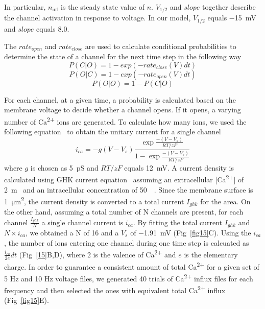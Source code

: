 \documentclass[10pt,letterpaper]{article}
\begin{document}
In particular, $n_{\inf}$ is the steady state value of $n$. $V_{1/2}$ and $slope$ together describe the channel activation in response to voltage. In our model, $V_{1/2}$ equals \SI{-15}{\mV} and $slope$ equals 8.0.

The $rate_{open}$ and $rate_{close}$ are used to calculate conditional probabilities to determine the state of a channel for the next time step in the following way
\begin{equation}P(C|O)=1-exp(-rate_{close}(V)dt)\end{equation}
\begin{equation}P(O|C)=1-exp(-rate_{open}(V)dt)\end{equation}
\begin{equation}P(O|O)=1-P(C|O)\end{equation}

For each channel, at a given time, a probability is calculated based on the membrane voltage to decide whether a channel opens. If it opens, a varying number of Ca\textsuperscript{2+} ions are generated. To calculate how many ions, we used the following equation~\cite{2013PNAS..11015794T} to obtain the unitary current for a single channel
\begin{equation}i_{ca}=-g(V-V_s)\frac{\exp\frac{-(V-V_s)}{RT/zF}}{1-\exp\frac{-(V-V_s)}{RT/zF}}\end{equation}
where $g$ is chosen as \SI{5}{\pico\siemens} and $RT/zF$ equals \SI{12}{\milli\volt}. A current density is calculated using GHK current equation~\cite{citeulike:306134} assuming an extracellular [Ca\textsuperscript{2+}] of \SI{2}{\m\Molar} and an intracellular concentration of \SI{50}{\nano\Molar}. Since the membrane surface is \SI{1}{\square\um}, the current density is converted to a total current $I_{ghk}$ for the area. On the other hand, assuming a total number of N channels are present, for each channel $\frac{I_{ghk}}{N}$ a single channel current is $i_{ca}$. By fitting the total current $I_{ghk}$ and $N\times i_{ca}$, we obtained a N of 16 and a $V_s$ of \SI{-1.91}{\milli\volt} (Fig~\ref{fig15}C). Using the $i_{ca}$, the number of ions entering one channel during one time step is calcuated as $\frac{i_{ca}}{2e}dt$ (Fig~\ref{15}B,D), where 2 is the valence of Ca\textsuperscript{2+} and $e$ is the elementary charge. In order to guarantee a consistent amount of total Ca\textsuperscript{2+} for a given set of 5 Hz and 10 Hz voltage files, we generated 40 trials of Ca\textsuperscript{2+} influx files for each frequency and then selected the ones with equivalent total Ca\textsuperscript{2+} influx (Fig~\ref{fig15}E).
\end{document}
